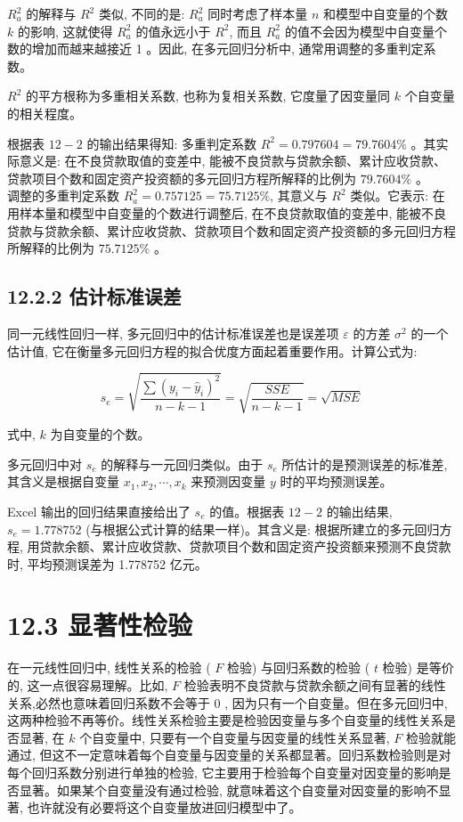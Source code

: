 \documentclass[10pt]{article}
\begin{document}
\begin{CJK*}{UTF8}{bsmi}
$R_{a}^{2}$ 的解释与 $R^{2}$ 类似, 不同的是: $R_{a}^{2}$ 同时考虑了样本量 $n$ 和模型中自变量的个数 $k$ 的影响, 这就使得 $R_{a}^{2}$ 的值永远小于 $R^{2}$, 而且 $R_{a}^{2}$ 的值不会因为模型中自变量个数的增加而越来越接近 1 。因此, 在多元回归分析中, 通常用调整的多重判定系数。

$R^{2}$ 的平方根称为多重相关系数, 也称为复相关系数, 它度量了因变量同 $k$ 个自变量的相关程度。

根据表 $12-2$ 的输出结果得知: 多重判定系数 $R^{2}=0.797604=79.7604 \%$ 。其实际意义是: 在不良贷款取值的变差中, 能被不良贷款与贷款余额、累计应收贷款、贷款项目个数和固定资产投资额的多元回归方程所解释的比例为 $79.7604 \%$ 。\\
调整的多重判定系数 $R_{a}^{2}=0.757125=75.7125 \%$, 其意义与 $R^{2}$ 类似。它表示: 在用样本量和模型中自变量的个数进行调整后, 在不良贷款取值的变差中, 能被不良贷款与贷款余额、累计应收贷款、贷款项目个数和固定资产投资额的多元回归方程所解释的比例为 $75.7125 \%$ 。

\subsection*{12.2.2 估计标准误差}
同一元线性回归一样, 多元回归中的估计标准误差也是误差项 $\varepsilon$ 的方差 $\sigma^{2}$ 的一个估计值, 它在衡量多元回归方程的拟合优度方面起着重要作用。计算公式为:


\begin{equation*}
s_{e}=\sqrt{\frac{\sum\left(y_{i}-\hat{y}_{i}\right)^{2}}{n-k-1}}=\sqrt{\frac{S S E}{n-k-1}}=\sqrt{M S E} \tag{12.9}
\end{equation*}


式中, $k$ 为自变量的个数。

多元回归中对 $s_{e}$ 的解释与一元回归类似。由于 $s_{e}$ 所估计的是预测误差的标准差, 其含义是根据自变量 $x_{1}, x_{2}, \cdots, x_{k}$ 来预测因变量 $y$ 时的平均预测误差。

Excel 输出的回归结果直接给出了 $s_{e}$ 的值。根据表 $12-2$ 的输出结果, $s_{e}=1.778752$ (与根据公式计算的结果一样)。其含义是: 根据所建立的多元回归方程, 用贷款余额、累计应收贷款、贷款项目个数和固定资产投资额来预测不良贷款时, 平均预测误差为 1.778752 亿元。

\section*{12.3 显著性检验}
在一元线性回归中, 线性关系的检验 ( $F$ 检验) 与回归系数的检验 ( $t$ 检验) 是等价的, 这一点很容易理解。比如, $F$ 检验表明不良贷款与贷款余额之间有显著的线性关系,必然也意味着回归系数不会等于 0 , 因为只有一个自变量。但在多元回归中, 这两种检验不再等价。线性关系检验主要是检验因变量与多个自变量的线性关系是否显著, 在 $k$ 个自变量中, 只要有一个自变量与因变量的线性关系显著, $F$ 检验就能通过, 但这不一定意味着每个自变量与因变量的关系都显著。回归系数检验则是对每个回归系数分别进行单独的检验, 它主要用于检验每个自变量对因变量的影响是否显著。如果某个自变量没有通过检验, 就意味着这个自变量对因变量的影响不显著, 也许就没有必要将这个自变量放进回归模型中了。


\end{CJK*}
\end{document}
